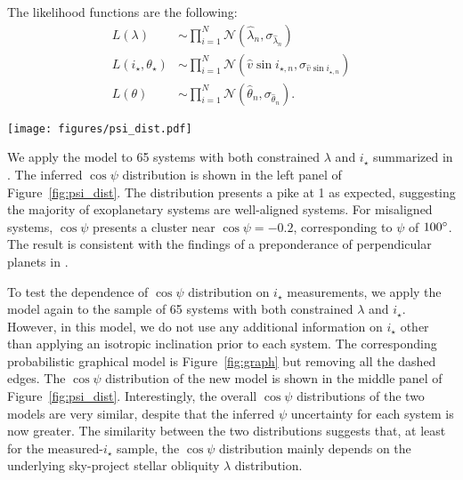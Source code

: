 \documentclass[twocolumn,times]{aastex631}
\newcommand{\numistar}{65\xspace}
\begin{document}
The likelihood functions are the following:
\begin{align}
    L(\lambda) &\sim \prod_{i=1}^N\mathcal{N}(\hat{\lambda}_n, \sigma_{\hat{\lambda}_n}) \nonumber\\
    L(i_\star, \theta_\star) &\sim \prod_{i=1}^N\mathcal{N}(\hat{v}\sin{i_{\star,n}}, \sigma_{\hat{v}\sin{i_{\star,n}}}) \nonumber\\
    L(\theta) &\sim \prod_{i=1}^N\mathcal{N}(\hat{\theta}_n, \sigma_{\hat{\theta}_n}).
\end{align}

\begin{figure*}[ht!]
    \begin{centering}
        \texttt{[image: figures/psi\_dist.pdf]}
        \caption{The cosine of 3D stellar obliquity $\cos{\psi}$ distributions.}
        \label{fig:psi_dist}
    \end{centering}
\end{figure*}

We apply the model to \numistar systems with both constrained $\lambda$ and $i_\star$ summarized in \cite{Albrecht21}. The inferred $\cos{\psi}$ distribution is shown in the left panel of Figure~\ref{fig:psi_dist}. The distribution presents a pike at 1 as expected, suggesting the majority of exoplanetary systems are well-aligned systems. For misaligned systems, $\cos{\psi}$ presents a cluster near $\cos{\psi} = -0.2$, corresponding to $\psi$ of $100\mbox{$^\circ$}$. The result is consistent with the findings of a preponderance of perpendicular planets in \cite{Albrecht21}.

To test the dependence of $\cos{\psi}$ distribution on $i_\star$ measurements, we apply the model again to the sample of \numistar systems with both constrained $\lambda$ and $i_\star$. However, in this model, we do not use any additional information on $i_\star$ other than applying an isotropic inclination prior to each system. The corresponding probabilistic graphical model is Figure~\ref{fig:graph} but removing all the dashed edges. 
The $\cos{\psi}$ distribution of the new model is shown in the middle panel of Figure~\ref{fig:psi_dist}. Interestingly, the overall $\cos{\psi}$ distributions of the two models are very similar, despite that the inferred $\psi$ uncertainty for each system is now greater.
The similarity between the two distributions suggests that, at least for the measured-$i_\star$ sample, the $\cos{\psi}$ distribution mainly depends on the underlying sky-project stellar obliquity $\lambda$ distribution.
\end{document}
